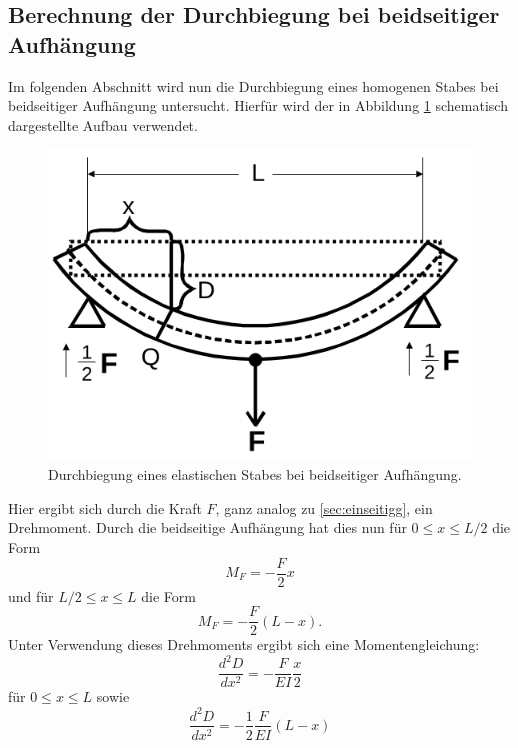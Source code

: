 \subsection{Berechnung der Durchbiegung bei beidseitiger Aufhängung}
\label{sec:beidseitigg}
Im folgenden Abschnitt wird nun die Durchbiegung eines homogenen Stabes bei beidseitiger Aufhängung untersucht.
Hierfür wird der in Abbildung \ref{fig:beidseitig1} schematisch dargestellte Aufbau verwendet.
\begin{figure}[H]
  \centering
  \includegraphics[scale=0.4]{content/Beidseitig.png}
  \caption{Durchbiegung eines elastischen Stabes bei beidseitiger Aufhängung. \cite{AP01}}
  \label{fig:beidseitig1}
\end{figure}
\noindent
Hier ergibt sich durch die Kraft $F$, ganz analog zu \ref{sec:einseitigg}, ein Drehmoment.
Durch die beidseitige Aufhängung hat dies nun für $0 \leq x \leq L/2$ die Form
\begin{equation}
  M_F = - \frac{F}{2}x
  \label{eqn:drehmomentbeidseitig1}
\end{equation}
und für $L/2 \leq x \leq L$ die Form
\begin{equation}
  M_F = -\frac{F}{2} (L - x).
  \label{eqn:drehmomentbeidseitig2}
\end{equation}
Unter Verwendung dieses Drehmoments ergibt sich eine Momentengleichung:
\begin{equation}
  \frac{d^2 D}{d x^2} =  - \frac{F}{E I} \frac{x}{2}
  \label{eqn:momentengleichungbeidseitig1}
\end{equation}
für $0 \leq x \leq L$ sowie
\begin{equation}
  \frac{d^2 D}{d x^2} = - \frac{1}{2} \frac{F}{E I} (L - x)
  \label{eqn:momentengleichungbeidseitig2}
\end{equation}
